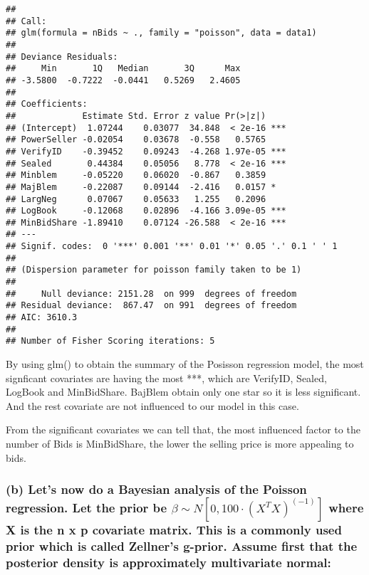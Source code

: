 \documentclass[]{article}
\begin{document}
\begin{verbatim}
## 
## Call:
## glm(formula = nBids ~ ., family = "poisson", data = data1)
## 
## Deviance Residuals: 
##     Min       1Q   Median       3Q      Max  
## -3.5800  -0.7222  -0.0441   0.5269   2.4605  
## 
## Coefficients:
##             Estimate Std. Error z value Pr(>|z|)    
## (Intercept)  1.07244    0.03077  34.848  < 2e-16 ***
## PowerSeller -0.02054    0.03678  -0.558   0.5765    
## VerifyID    -0.39452    0.09243  -4.268 1.97e-05 ***
## Sealed       0.44384    0.05056   8.778  < 2e-16 ***
## Minblem     -0.05220    0.06020  -0.867   0.3859    
## MajBlem     -0.22087    0.09144  -2.416   0.0157 *  
## LargNeg      0.07067    0.05633   1.255   0.2096    
## LogBook     -0.12068    0.02896  -4.166 3.09e-05 ***
## MinBidShare -1.89410    0.07124 -26.588  < 2e-16 ***
## ---
## Signif. codes:  0 '***' 0.001 '**' 0.01 '*' 0.05 '.' 0.1 ' ' 1
## 
## (Dispersion parameter for poisson family taken to be 1)
## 
##     Null deviance: 2151.28  on 999  degrees of freedom
## Residual deviance:  867.47  on 991  degrees of freedom
## AIC: 3610.3
## 
## Number of Fisher Scoring iterations: 5
\end{verbatim}

By using glm() to obtain the summary of the Posisson regression model,
the most signficant covariates are having the most ***, which are
VerifyID, Sealed, LogBook and MinBidShare. BajBlem obtain only one star
so it is less significant. And the rest covariate are not influenced to
our model in this case.

From the significant covariates we can tell that, the most influenced
factor to the number of Bids is MinBidShare, the lower the selling price
is more appealing to bids.

\hypertarget{b-lets-now-do-a-bayesian-analysis-of-the-poisson-regression.-let-the-prior-be-beta-sim-n0100cdot-xt-x-1-where-x-is-the-n-x-p-covariate-matrix.-this-is-a-commonly-used-prior-which-is-called-zellners-g-prior.-assume-first-that-the-posterior-density-is-approximately-multivariate-normal}{%
\subsubsection{\texorpdfstring{(b) Let's now do a Bayesian analysis of
the Poisson regression. Let the prior be
\(\beta \sim N[0,100\cdot (X^T X)^(-1)]\) where X is the n x p covariate
matrix. This is a commonly used prior which is called Zellner's g-prior.
Assume first that the posterior density is approximately multivariate
normal:}{(b) Let's now do a Bayesian analysis of the Poisson regression. Let the prior be \textbackslash beta \textbackslash sim N{[}0,100\textbackslash cdot (X\^{}T X)\^{}(-1){]} where X is the n x p covariate matrix. This is a commonly used prior which is called Zellner's g-prior. Assume first that the posterior density is approximately multivariate normal:}}\label{b-lets-now-do-a-bayesian-analysis-of-the-poisson-regression.-let-the-prior-be-beta-sim-n0100cdot-xt-x-1-where-x-is-the-n-x-p-covariate-matrix.-this-is-a-commonly-used-prior-which-is-called-zellners-g-prior.-assume-first-that-the-posterior-density-is-approximately-multivariate-normal}}
\end{document}
